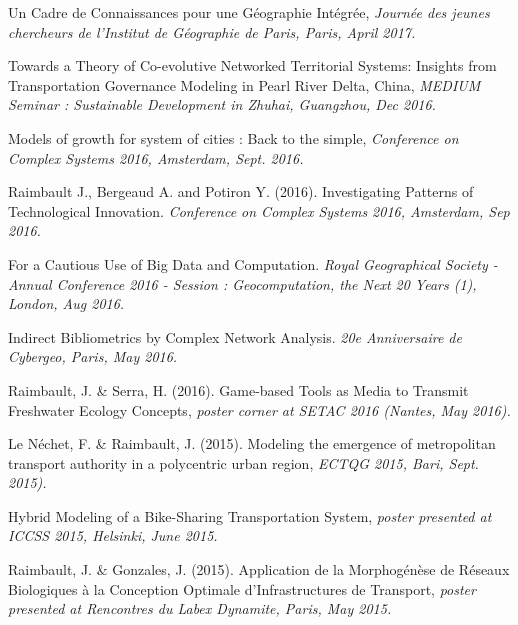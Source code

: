\bigskip

\noindent Un Cadre de Connaissances pour une Géographie Intégrée,  \textit{Journée des jeunes chercheurs de l'Institut de Géographie de Paris, Paris, April 2017.}


\bigskip


\noindent Towards a Theory of Co-evolutive Networked Territorial Systems: Insights from Transportation Governance Modeling in Pearl River Delta, China, \textit{MEDIUM Seminar : Sustainable Development in Zhuhai, Guangzhou, Dec 2016.}


\bigskip


\noindent Models of growth for system of cities : Back to the simple, \textit{Conference on Complex Systems 2016, Amsterdam, Sept. 2016.}


\bigskip

\noindent Raimbault J., Bergeaud A. and Potiron Y. (2016). Investigating Patterns of Technological Innovation. \textit{Conference on Complex Systems 2016, Amsterdam, Sep 2016.}


\bigskip

\noindent For a Cautious Use of Big Data and Computation. \textit{Royal Geographical Society - Annual Conference 2016 - Session : Geocomputation, the Next 20 Years (1), London, Aug 2016.}


\bigskip

\noindent Indirect Bibliometrics by Complex Network Analysis. \textit{20e Anniversaire de Cybergeo, Paris, May 2016.}


\bigskip

\noindent Raimbault, J. \& Serra, H. (2016). Game-based Tools as Media to Transmit Freshwater Ecology Concepts, \textit{poster corner at SETAC 2016 (Nantes, May 2016).}


\bigskip

\noindent Le Néchet, F. \& Raimbault, J. (2015). Modeling the emergence of metropolitan transport authority in a polycentric urban region, \textit{ECTQG 2015, Bari, Sept. 2015).}


\bigskip

\noindent Hybrid Modeling of a Bike-Sharing Transportation System, \textit{poster presented at ICCSS 2015, Helsinki, June 2015.}

\bigskip

\noindent Raimbault, J. \& Gonzales, J. (2015). Application de la Morphog{\'e}n{\`e}se de R{\'e}seaux Biologiques {\`a} la Conception Optimale d'Infrastructures de Transport, \textit{poster presented at Rencontres du Labex Dynamite, Paris, May 2015.}


